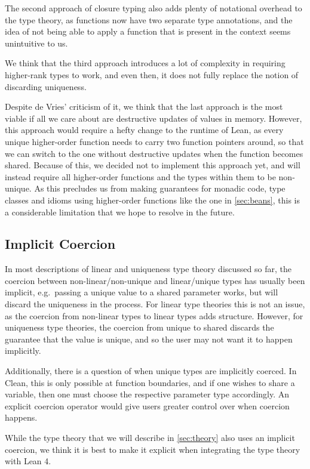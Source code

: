 The second approach of closure typing also adds plenty of notational overhead to the type theory, as functions now have two separate type annotations, and the idea of not being able to apply a function that is present in the context seems unintuitive to us.

We think that the third approach introduces a lot of complexity in requiring higher-rank types to work, and even then, it does not fully replace the notion of discarding uniqueness.

Despite de Vries' criticism of it, we think that the last approach is the most viable if all we care about are destructive updates of values in memory. However, this approach would require a hefty change to the runtime of Lean, as every unique higher-order function needs to carry two function pointers around, so that we can switch to the one without destructive updates when the function becomes shared. Because of this, we decided not to implement this approach yet, and will instead require all higher-order functions and the types within them to be non-unique. As this precludes us from making guarantees for monadic code, type classes and idioms using higher-order functions like the one in \cref{sec:beans}, this is a considerable limitation that we hope to resolve in the future.

\subsection{Implicit Coercion}\label{sec:coercions}
In most descriptions of linear and uniqueness type theory discussed so far, the coercion between non-linear/non-unique and linear/unique types has usually been implicit, e.g.\ passing a unique value to a shared parameter works, but will discard the uniqueness in the process. For linear type theories this is not an issue, as the coercion from non-linear types to linear types adds structure. However, for uniqueness type theories, the coercion from unique to shared discards the guarantee that the value is unique, and so the user may not want it to happen implicitly. 

Additionally, there is a question of when unique types are implicitly coerced. In Clean, this is only possible at function boundaries, and if one wishes to share a variable, then one must choose the respective parameter type accordingly. An explicit coercion operator would give users greater control over when coercion happens.

While the type theory that we will describe in \cref{sec:theory} also uses an implicit coercion, we think it is best to make it explicit when integrating the type theory with Lean 4.

